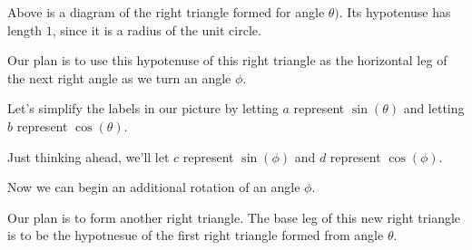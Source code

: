 \documentclass{ximera}
\begin{document}
Above is a diagram of the right triangle formed for angle $\theta)$. Its hypotenuse has length $1$, since it is a radius of the unit circle.


Our plan is to use this hypotenuse of this right triangle as the horizontal leg of the next right angle as we turn an angle $\phi$.


Let's simplify the labels in our picture by letting $a$ represent $\sin(\theta)$ and letting $b$ represent $\cos(\theta)$. 

Just thinking ahead, we'll let $c$ represent $\sin(\phi)$ and $d$ represent $\cos(\phi)$.


Now we can begin an additional rotation of an angle $\phi$.

Our plan is to form another right triangle. The base leg of this new right triangle is to be the hypotnesue of the first right triangle formed from angle $\theta$.




\begin{image}[3in]
  \end{image}
\end{document}
